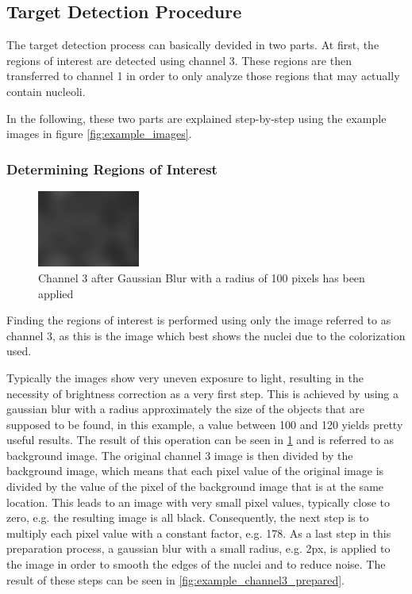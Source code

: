 \documentclass[a4paper, 12pt]{article}
\begin{document}
\subsection{Target Detection Procedure}
The target detection process can basically devided in two parts. At first, the
regions of interest are detected using channel 3. These regions are then
transferred to channel 1 in order to only analyze those regions that may
actually contain nucleoli.

In the following, these two parts are explained step-by-step using the example
images in figure \ref{fig:example_images}.


\subsubsection{Determining Regions of Interest}

\begin{figure}
\vspace{-14pt}
\includegraphics[width=0.3\textwidth]{images/example_Kanal3_gaussian100}
\caption{Channel 3 after Gaussian Blur with a radius of 100 pixels has been
applied}
\label{fig:example_channel3_gaussian}
\vspace{-28pt}
\end{figure}
Finding the regions of interest is performed using only the image referred to as
channel 3, as this is the image which best shows the nuclei due to the
colorization used.

Typically the images show very uneven exposure to light, resulting in the
necessity of brightness correction as a very first step. This is achieved by
using a gaussian blur with a radius approximately the size of the objects that
are supposed to be found, in this example, a value between 100 and 120 yields
pretty useful results. The result of this operation can be seen in
\ref{fig:example_channel3_gaussian} and is referred to as background image. The
original channel 3 image is then divided by the background image, which means
that each pixel value of the original image is divided by the value of the pixel
of the background image that is at the same location. 
This leads to an image with very small pixel values, typically close to zero,
e.g. the resulting image is all black. Consequently, the next step is to
multiply each pixel value with a constant factor, e.g. 178. As a last step in
this preparation process, a gaussian blur with a small radius, e.g. 2px, is
applied to the image in order to smooth the edges of the nuclei and to reduce
noise. The result of these steps can be seen in \ref{fig:example_channel3_prepared}.
\end{document}

